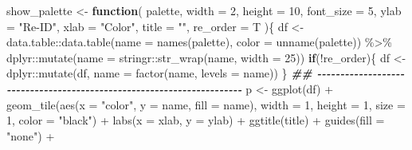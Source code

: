 \documentclass[
]{article}
\newenvironment{Shaded}{\begin{snugshade}}{\end{snugshade}}
\newcommand{\AttributeTok}[1]{\textcolor[rgb]{0.77,0.63,0.00}{#1}}
\newcommand{\ControlFlowTok}[1]{\textcolor[rgb]{0.13,0.29,0.53}{\textbf{#1}}}
\newcommand{\DecValTok}[1]{\textcolor[rgb]{0.00,0.00,0.81}{#1}}
\newcommand{\DocumentationTok}[1]{\textcolor[rgb]{0.56,0.35,0.01}{\textbf{\textit{#1}}}}
\newcommand{\FunctionTok}[1]{\textcolor[rgb]{0.00,0.00,0.00}{#1}}
\newcommand{\NormalTok}[1]{#1}
\newcommand{\OtherTok}[1]{\textcolor[rgb]{0.56,0.35,0.01}{#1}}
\newcommand{\SpecialCharTok}[1]{\textcolor[rgb]{0.00,0.00,0.00}{#1}}
\newcommand{\StringTok}[1]{\textcolor[rgb]{0.31,0.60,0.02}{#1}}
\begin{document}
\begin{Shaded}
\begin{Highlighting}[]
\NormalTok{show\_palette }\OtherTok{\textless{}{-}} 
  \ControlFlowTok{function}\NormalTok{(}
\NormalTok{           palette,}
           \AttributeTok{width =} \DecValTok{2}\NormalTok{,}
           \AttributeTok{height =} \DecValTok{10}\NormalTok{,}
           \AttributeTok{font\_size =} \DecValTok{5}\NormalTok{,}
           \AttributeTok{ylab =} \StringTok{"Re{-}ID"}\NormalTok{,}
           \AttributeTok{xlab =} \StringTok{"Color"}\NormalTok{,}
           \AttributeTok{title =} \StringTok{""}\NormalTok{,}
           \AttributeTok{re\_order =}\NormalTok{ T}
\NormalTok{           )\{}
\NormalTok{    df }\OtherTok{\textless{}{-}}\NormalTok{ data.table}\SpecialCharTok{::}\FunctionTok{data.table}\NormalTok{(}\AttributeTok{name =} \FunctionTok{names}\NormalTok{(palette), }\AttributeTok{color =} \FunctionTok{unname}\NormalTok{(palette)) }\SpecialCharTok{\%\textgreater{}\%} 
\NormalTok{      dplyr}\SpecialCharTok{::}\FunctionTok{mutate}\NormalTok{(}\AttributeTok{name =}\NormalTok{ stringr}\SpecialCharTok{::}\FunctionTok{str\_wrap}\NormalTok{(name, }\AttributeTok{width =} \DecValTok{25}\NormalTok{))}
    \ControlFlowTok{if}\NormalTok{(}\SpecialCharTok{!}\NormalTok{re\_order)\{}
\NormalTok{      df }\OtherTok{\textless{}{-}}\NormalTok{ dplyr}\SpecialCharTok{::}\FunctionTok{mutate}\NormalTok{(df, }\AttributeTok{name =} \FunctionTok{factor}\NormalTok{(name, }\AttributeTok{levels =}\NormalTok{ name))}
\NormalTok{    \}}
    \DocumentationTok{\#\# {-}{-}{-}{-}{-}{-}{-}{-}{-}{-}{-}{-}{-}{-}{-}{-}{-}{-}{-}{-}{-}{-}{-}{-}{-}{-}{-}{-}{-}{-}{-}{-}{-}{-}{-}{-}{-}{-}{-}{-}{-}{-}{-}{-}{-}{-}{-}{-}{-}{-}{-}{-}{-}{-}{-}{-}{-}{-}{-}{-}{-}{-}{-}{-}{-}{-}{-}{-}{-}{-} }
\NormalTok{    p }\OtherTok{\textless{}{-}} \FunctionTok{ggplot}\NormalTok{(df) }\SpecialCharTok{+}
      \FunctionTok{geom\_tile}\NormalTok{(}\FunctionTok{aes}\NormalTok{(}\AttributeTok{x =} \StringTok{"color"}\NormalTok{, }\AttributeTok{y =}\NormalTok{ name,}
                    \AttributeTok{fill =}\NormalTok{ name),}
                \AttributeTok{width =} \DecValTok{1}\NormalTok{, }\AttributeTok{height =} \DecValTok{1}\NormalTok{, }\AttributeTok{size =} \DecValTok{1}\NormalTok{, }\AttributeTok{color =} \StringTok{"black"}\NormalTok{) }\SpecialCharTok{+}
      \FunctionTok{labs}\NormalTok{(}\AttributeTok{x =}\NormalTok{ xlab, }\AttributeTok{y =}\NormalTok{ ylab) }\SpecialCharTok{+}
      \FunctionTok{ggtitle}\NormalTok{(title) }\SpecialCharTok{+}
      \FunctionTok{guides}\NormalTok{(}\AttributeTok{fill =} \StringTok{"none"}\NormalTok{) }\SpecialCharTok{+}

\end{Highlighting}
\end{Shaded}
\end{document}
